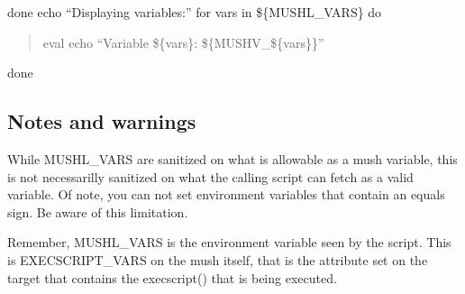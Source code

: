 \documentclass[letterpaper,10pt,english]{sphinxmanual}
\begin{document}
\sphinxAtStartPar
done
echo “Displaying variables:”
for vars in \$\{MUSHL\_VARS\}
do
\begin{quote}

\sphinxAtStartPar
eval echo “Variable \$\{vars\}: \$\{MUSHV\_\$\{vars\}\}”
\end{quote}

\sphinxAtStartPar
done


\subsection{Notes and warnings}
\label{\detokenize{advanced:notes-and-warnings}}
\sphinxAtStartPar
While MUSHL\_VARS are sanitized on what is allowable as a mush variable, this
is not necessarilly sanitized on what the calling script can fetch as a valid
variable.  Of note, you can not set environment variables that contain an
equals sign.  Be aware of this limitation.

\sphinxAtStartPar
Remember, MUSHL\_VARS is the environment variable seen by the script.
This is EXECSCRIPT\_VARS on the mush itself, that is the attribute set
on the target that contains the execscript() that is being executed.
\end{document}
